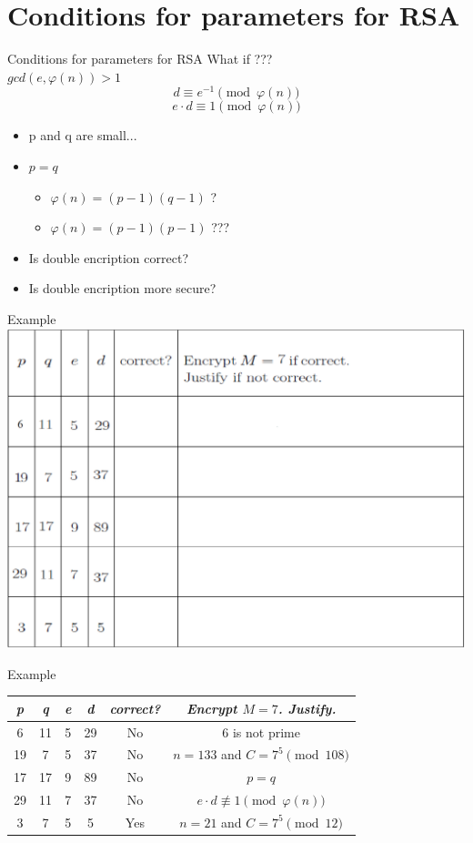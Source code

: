 \documentclass{beamer}
\begin{document}
\section{Conditions for parameters for RSA}

\begin{frame}{Conditions for parameters for RSA}
    What if ??? \\
    $gcd(e, \varphi(n)) > 1$ 
    $$d \equiv e^{-1} \pmod{ \varphi(n)}$$
    $$e \cdot d \equiv 1 \pmod{\varphi(n)}$$
    \begin{itemize}
        \item p and q are small...
        \item $p = q$
        \begin{itemize}
            \item $\varphi(n) = (p-1)(q-1)$ ?
            \item $\varphi(n) = (p-1)(p-1)$ ???
        \end{itemize}
        \item Is double encription correct?
        \item Is double encription more secure?
    \end{itemize}
\end{frame}

\begin{frame}{Example}
    \centering
    \includegraphics[width=.7\linewidth]{1.png}
\end{frame}

\begin{frame}{Example}
    \centering
    \begin{tabular}{|c|c|c|c|c|c|}
        \hline
         \textit{p}  & \textit{q}  & \textit{e}  & \textit{d}  & \textit{correct?} & \textit{Encrypt $M = 7$. Justify.}  \\ \hline
         6  & 11 & 5  & 29 & No       & 6 is not prime  \\ \hline
         19 & 7  & 5  & 37 & No       & $n = 133$ and $C = 7^5 \pmod{108} $  \\ \hline
         17 & 17 & 9  & 89 & No       & $p = q$  \\ \hline
         29 & 11 & 7  & 37 & No       & $e \cdot d \not\equiv 1 \pmod{\varphi(n)} $  \\ \hline
         3  & 7  & 5  & 5  & Yes      & $n = 21$ and $C = 7^5 \pmod{12}$  \\ \hline
    \end{tabular}
\end{frame}
\end{document}
